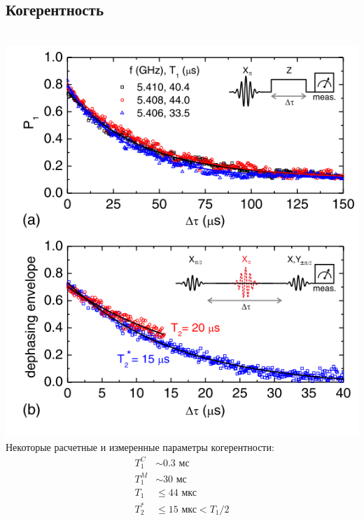 \documentclass[aspectratio=169, 13pt, t]{beamer}
\begin{document}
\subsection{Когерентность}
\begin{frame}[c]\frametitle{\secname}\framesubtitle{\subsecname}
\begin{columns}[c]
\centering
\includegraphics[height=0.9\textheight]{coherence}
Некоторые расчетные и измеренные параметры когерентности:
\begin{align*}
T_1^C &\sim 0.3\text{ мс} \\
T_1^M &\sim 30\text{ мс} \\
T_1 &\leq 44 \text{ мкс} \\
T_2^* &\leq 15 \text{ мкс} < T_1/2  
\end{align*}
\end{columns}
\end{frame}
\end{document}
